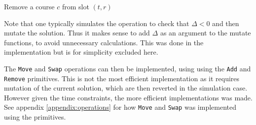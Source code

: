 \begin{algorithm}[H]
  \caption{Remove a course $c$ from slot $(t, r)$}
  \begin{algorithmic}[1]
       
          \State {}
      \EndIf
      \State {} 
    \EndFunction
    
    \Statex
        \EndIf
    \EndFunction
  \end{algorithmic}
\end{algorithm}

Note that one typically simulates the operation to check that $\Delta < 0$ and then mutate the solution. Thus it makes sense to add $\Delta$ as an argument to the mutate functions, to avoid unnecessary calculations. This was done in the implementation but is for simplicity excluded here.

The \texttt{Move} and \texttt{Swap} operations can then be implemented, using using the \texttt{Add} and \texttt{Remove} primitives. This is not the most efficient implementation as it requires mutation of the current solution, which are then reverted in the simulation case. However given the time constraints, the more efficient implementations was made. See appendix \ref{appendix:operations} for how \texttt{Move} and \texttt{Swap} was implemented using the primitives.
